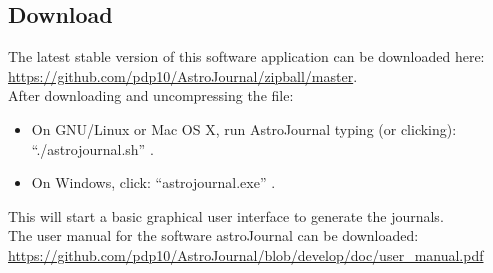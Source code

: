 \subsection{Download}
\label{subsec:Download}
The latest stable version of this software application can be downloaded here:\\
\href{https://github.com/pdp10/AstroJournal/zipball/master}{https://github.com/pdp10/AstroJournal/zipball/master}.\\

After downloading and uncompressing the file:
\begin{itemize}
 \item On GNU/Linux or Mac OS X, run AstroJournal typing (or clicking): ``./astrojournal.sh'' .
 \item On Windows, click: ``astrojournal.exe'' .
\end{itemize}
This will start a basic graphical user interface to generate the journals.\\
The user manual for the software astroJournal can be downloaded:\\ \href{https://github.com/pdp10/AstroJournal/blob/develop/doc/user\_manual.pdf}{https://github.com/pdp10/AstroJournal/blob/develop/doc/user\_manual.pdf}
